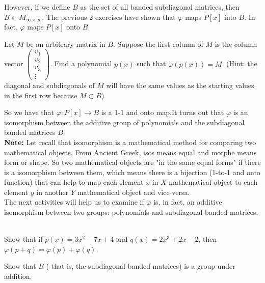 However, if we define $B$ as the set of all banded subdiagonal matrices, then $B\subset M_{\infty \times \infty}$. The previous 2 exercises have shown that $\varphi$ maps $P[x]$ into $B$. In fact, $\varphi$ maps $P[x]$ onto $B$.

\begin{exercise}{}
Let $M$ be an arbitrary matrix in $B$. Suppose the first column of $M$ is the column vector $\left(\begin{array}{c}v_1\\v_2\\v_3\\\vdots\end{array}\right)$. Find a polynomial $p(x)$ such that $\varphi(p(x)) = M$. (Hint: the diagonal and subdiagonals of $M$ will have the same values as the starting values in the first row because $M\subset B$)
\end{exercise}
So we have that $\varphi:P[x]\to B$ is a 1-1 and onto map.It turns out that $\varphi$ is an isomorphism between the additive group of polynomials   and the subdiagonal banded matrices $B$.\\
\textbf{Note:} Let recall that isomorphism is a mathematical method for comparing two mathematical objects. From Ancient Greek, isos means equal and morphe means form or shape. So two mathematical objects are "in the same equal forms" if there is a isomorphism between them, which means there is a bijection (1-to-1 and onto function) that can help to map each element $x$ in $X$ mathematical object to each element $y$ in another $Y$ mathematical object and vice-versa.\\
The next activities will help us to examine if $\varphi$ is, in fact, an additive isomorphism between two groups: polynomials and subdiagonal banded matrices.\\
\\
\begin{exercise}{}
	Show that if $p(x) = 3x^2 - 7x + 4$ and $q(x) = 2x^3 + 2x - 2$, then $\varphi(p + q) = \varphi(p) + \varphi(q)$.
\end{exercise}

\begin{exercise}{}
	Show that $B$ ( that is, the subdiagonal banded matrices) is a group under addition.
\end{exercise}

